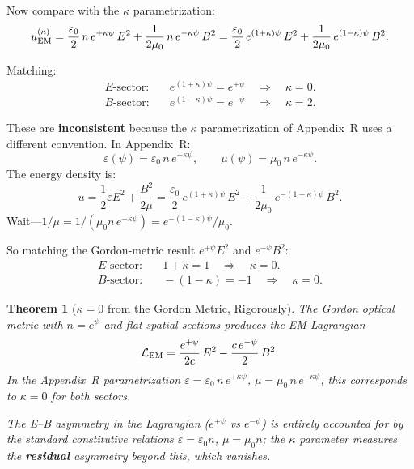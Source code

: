 \documentclass[11pt,a4paper]{article}
\newtheorem{theorem}{Theorem}
\theoremstyle{definition}
\theoremstyle{remark}
\begin{document}
Now compare with the $\kappa$ parametrization:
\begin{equation}
u_{\rm EM}^{(\kappa)} = \frac{\varepsilon_0}{2}\,n\,e^{+\kappa\psi}\,E^2
+ \frac{1}{2\mu_0}\,n\,e^{-\kappa\psi}\,B^2
= \frac{\varepsilon_0}{2}\,e^{(1+\kappa)\psi}\,E^2
+ \frac{1}{2\mu_0}\,e^{(1-\kappa)\psi}\,B^2.
\end{equation}

Matching:
\begin{align}
E\text{-sector:} &\quad e^{(1+\kappa)\psi} = e^{+\psi}
\quad\Rightarrow\quad \kappa = 0. \\[4pt]
B\text{-sector:} &\quad e^{(1-\kappa)\psi} = e^{-\psi}
\quad\Rightarrow\quad \kappa = 2.
\end{align}

These are \textbf{inconsistent} because the $\kappa$ parametrization
of Appendix~R uses a different convention.  In Appendix~R:
\begin{equation}
\varepsilon(\psi) = \varepsilon_0\,n\,e^{+\kappa\psi}, \qquad
\mu(\psi) = \mu_0\,n\,e^{-\kappa\psi}.
\end{equation}
The energy density is:
\begin{equation}
u = \frac{1}{2}\varepsilon E^2 + \frac{B^2}{2\mu}
= \frac{\varepsilon_0}{2}\,e^{(1+\kappa)\psi}\,E^2
+ \frac{1}{2\mu_0}\,e^{-(1-\kappa)\psi}\,B^2.
\end{equation}
Wait---$1/\mu = 1/(\mu_0 n\,e^{-\kappa\psi}) = e^{-(1-\kappa)\psi}/\mu_0$.

So matching the Gordon-metric result $e^{+\psi}E^2$ and $e^{-\psi}B^2$:
\begin{align}
E\text{-sector:} &\quad 1+\kappa = 1
\quad\Rightarrow\quad \kappa = 0. \\[4pt]
B\text{-sector:} &\quad -(1-\kappa) = -1
\quad\Rightarrow\quad \kappa = 0. \label{eq:kappa-zero-confirmed}
\end{align}

\begin{theorem}[$\kappa = 0$ from the Gordon Metric, Rigorously]\label{thm:kappa-zero-final}
The Gordon optical metric with $n = e^\psi$ and flat spatial sections
produces the EM Lagrangian
\begin{equation}
\mathcal{L}_{\rm EM} = \frac{e^{+\psi}}{2c}\,E^2
- \frac{c\,e^{-\psi}}{2}\,B^2.
\end{equation}
In the Appendix~R parametrization
$\varepsilon = \varepsilon_0\,n\,e^{+\kappa\psi}$,
$\mu = \mu_0\,n\,e^{-\kappa\psi}$, this corresponds to
$\kappa = 0$ for both sectors.

The E--B asymmetry in the Lagrangian ($e^{+\psi}$ vs $e^{-\psi}$) is
entirely accounted for by the standard constitutive relations
$\varepsilon = \varepsilon_0 n$, $\mu = \mu_0 n$; the $\kappa$
parameter measures the \textbf{residual} asymmetry beyond this,
which vanishes.
\end{theorem}
\end{document}
